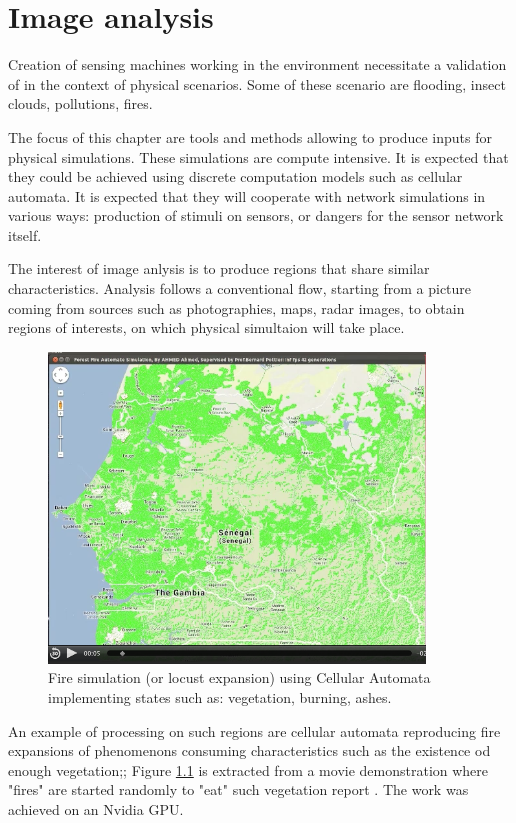 
\chapter{Image analysis} 
 
Creation of sensing machines working in the environment necessitate 
a validation of in the context of physical scenarios. Some of these 
scenario are flooding, insect clouds, pollutions, fires.

The focus of this chapter are tools and methods allowing to produce inputs
for physical  simulations. These simulations are compute intensive. It is expected
that they could be achieved using discrete computation models such as
cellular automata. It is expected that they will cooperate with network simulations
in various ways: production of stimuli on sensors, or dangers for the sensor network
itself.

The interest of image anlysis is to produce regions that share similar characteristics.
Analysis follows a conventional flow, starting from a picture coming from sources such as
photographies, maps, radar images, to obtain regions of interests, on which physical simultaion will
take place.


\begin{figure}[hbtp]
\begin{center} 
\includegraphics[width=10cm]{AhmedFire.png}
\caption{Fire simulation (or locust expansion) using Cellular Automata implementing  states such as:
vegetation, burning, ashes.}
\label{fig:AhmedFire}
\end{center}
\end{figure}

An example of processing on such regions are cellular automata
reproducing fire expansions of phenomenons consuming characteristics such as the existence od enough vegetation;;
Figure \ref{fig:AhmedFire} is extracted from a
movie demonstration where "fires" are started randomly to "eat" such vegetation report \cite{AhmedFire}. The
work was achieved on an Nvidia GPU.


